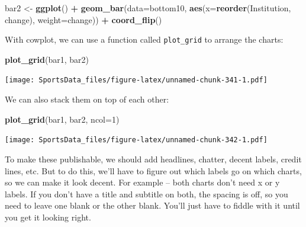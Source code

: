 \documentclass[
]{book}
\newenvironment{Shaded}{\begin{snugshade}}{\end{snugshade}}
\newcommand{\DataTypeTok}[1]{\textcolor[rgb]{0.13,0.29,0.53}{#1}}
\newcommand{\DecValTok}[1]{\textcolor[rgb]{0.00,0.00,0.81}{#1}}
\newcommand{\KeywordTok}[1]{\textcolor[rgb]{0.13,0.29,0.53}{\textbf{#1}}}
\newcommand{\NormalTok}[1]{#1}
\newcommand{\OperatorTok}[1]{\textcolor[rgb]{0.81,0.36,0.00}{\textbf{#1}}}
\newcommand{\StringTok}[1]{\textcolor[rgb]{0.31,0.60,0.02}{#1}}
\begin{document}
\begin{Shaded}
\begin{Highlighting}[]
\NormalTok{bar2 <-}\StringTok{ }\KeywordTok{ggplot}\NormalTok{() }\OperatorTok{+}\StringTok{ }\KeywordTok{geom_bar}\NormalTok{(}\DataTypeTok{data=}\NormalTok{bottom10, }\KeywordTok{aes}\NormalTok{(}\DataTypeTok{x=}\KeywordTok{reorder}\NormalTok{(Institution, change), }\DataTypeTok{weight=}\NormalTok{change)) }\OperatorTok{+}\StringTok{ }\KeywordTok{coord_flip}\NormalTok{()}
\end{Highlighting}
\end{Shaded}

With cowplot, we can use a function called \texttt{plot\_grid} to arrange the charts:

\begin{Shaded}
\begin{Highlighting}[]
\KeywordTok{plot_grid}\NormalTok{(bar1, bar2) }
\end{Highlighting}
\end{Shaded}

\texttt{[image: SportsData\_files/figure-latex/unnamed-chunk-341-1.pdf]}

We can also stack them on top of each other:

\begin{Shaded}
\begin{Highlighting}[]
\KeywordTok{plot_grid}\NormalTok{(bar1, bar2, }\DataTypeTok{ncol=}\DecValTok{1}\NormalTok{) }
\end{Highlighting}
\end{Shaded}

\texttt{[image: SportsData\_files/figure-latex/unnamed-chunk-342-1.pdf]}

To make these publishable, we should add headlines, chatter, decent labels, credit lines, etc. But to do this, we'll have to figure out which labels go on which charts, so we can make it look decent. For example -- both charts don't need x or y labels. If you don't have a title and subtitle on both, the spacing is off, so you need to leave one blank or the other blank. You'll just have to fiddle with it until you get it looking right.
\end{document}
